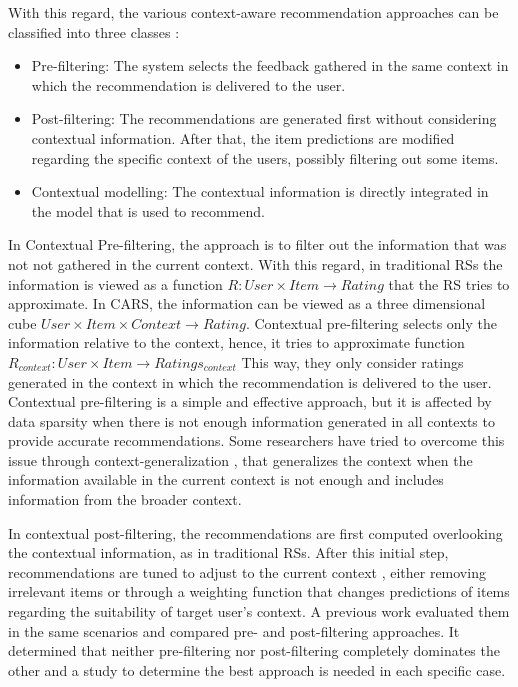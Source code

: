 \documentclass[preprint]{elsarticle}
\begin{document}
\begin{spacing}{1.5}
With this regard, the various context-aware recommendation approaches can be classified into three classes \cite{Adomavicius2011}:
\begin{itemize}
	\item Pre-filtering: The system selects the feedback gathered in the same context in which the recommendation is delivered to the user.
	\item Post-filtering: The recommendations are generated first without considering contextual information. After that, the item predictions are modified regarding the specific context of the users, possibly filtering out some items.
	\item Contextual modelling: The contextual information is directly integrated in the model that is used to recommend.
\end{itemize}

In Contextual Pre-filtering, the approach is to filter out the information that was not not gathered in the current context. With this regard, in traditional RSs the information is viewed as a function $R: User \times Item \rightarrow Rating $ that the RS tries to approximate. In CARS, the information can be viewed as a three dimensional cube $User \times Item \times Context \rightarrow Rating$. Contextual pre-filtering selects only the information relative to the context, hence, it tries to approximate function $R_{context}: User \times Item \rightarrow Ratings_{context}$ This way, they only consider ratings generated in the context in which the recommendation is delivered to the user. Contextual pre-filtering is a simple and effective approach, but it is affected by data sparsity when there is not enough information generated in all contexts to provide accurate recommendations. Some researchers have tried to overcome this issue through context-generalization \cite{Adomavicius2011}, that generalizes the context when the information available in the current context is not enough and includes information from the broader context.

In contextual post-filtering, the recommendations are first computed overlooking the contextual information, as in traditional RSs. After this initial step, recommendations are tuned to adjust to the current context \cite{Panniello2009}, either removing irrelevant items or through a weighting function that changes predictions of items regarding the suitability of target user's context. A previous work \cite{} evaluated them in the same scenarios and compared pre- and post-filtering approaches. It determined that neither pre-filtering nor post-filtering completely dominates the other and a study to determine the best approach is needed in each specific case.


\end{spacing}
\end{document}
